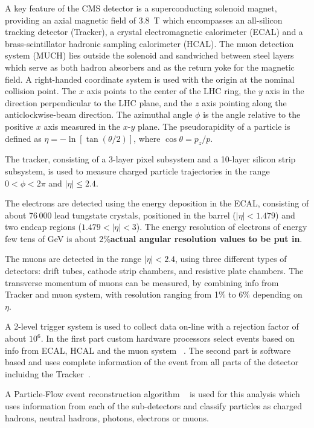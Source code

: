  A key feature of the CMS detector is a superconducting solenoid magnet, 
providing an axial magnetic
field of 3.8~T which encompasses an all-silicon tracking detector (Tracker), a crystal electromagnetic calorimeter (ECAL) and a brass-scintillator hadronic sampling calorimeter (HCAL). The muon detection system (MUCH) lies outside the solenoid and sandwiched between steel layers
which serve as both hadron absorbers and 
as the return yoke for the magnetic field. A right-handed coordinate system is used 
with the origin at the nominal collision point. The  $x$ axis
points to the center of the LHC ring, the $y$ axis in the direction 
perpendicular to the LHC plane, and the $z$ axis pointing along the
anticlockwise-beam direction. The azimuthal angle $\phi$ is the angle relative to the positive $x$ axis measured in the $x$-$y$ plane. The pseudorapidity of a particle is defined as $\eta = -\ln [\tan (\theta/2)]$, where $\cos \theta = p_z/p$. 

 The tracker, consisting of a 3-layer pixel subsystem and a 10-layer silicon strip subsystem, is used to measure charged particle trajectories in the range $0<\phi<2\pi$ and $|\eta|\le 2.4$.

The electrons are detected using the energy deposition in the ECAL, consisting of about 76\,000 lead tungstate crystals,  positioned in the barrel ($|\eta| < 1.479$) and two endcap regions ($1.479 < |\eta| < 3$). The energy resolution of electrons of energy few tens of GeV is about 2\%{\bf actual angular resolution values to be put in}.

The muons are detected in the range $|\eta|< 2.4$,  using three different types of detectors: drift tubes, cathode  strip chambers, and  resistive plate chambers. The transverse momentum  of muons can be measured, by combining  info from Tracker and muon system,  with resolution ranging from  1\% to 6\% depending on $\eta$.

A 2-level trigger system is used to collect data on-line with a rejection factor of about $10^6$. In the first part custom hardware processors select events based on info from ECAL, HCAL and the muon system ~\cite{L1TDR}. The second part is software based and uses complete information of the event from all parts of the detector incluidng the Tracker~\cite{HLTTDR}.  

A Particle-Flow event reconstruction algorithm ~\cite{CMS-PAS-PFT-10-002} is used for this analysis which uses information from each of the sub-detectors and classify particles as charged hadrons, neutral hadrons, photons, electrons or muons. 

